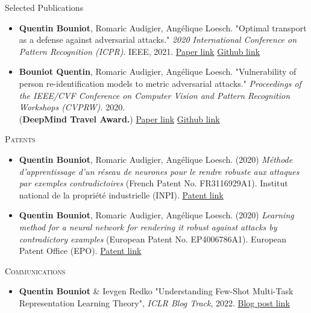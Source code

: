\documentclass{resume} %
\begin{document}
\begin{rSection}{Selected Publications}
\begin{itemize}[label=$\cdot$]
        \item \textbf{Quentin Bouniot}, Romaric Audigier, Angélique Loesch. "Optimal transport as a defense against adversarial attacks." \emph{2020 International Conference on Pattern Recognition (ICPR)}. IEEE, 2021. \href{https://arxiv.org/abs/2102.03156}{Paper link} \href{https://github.com/CEA-LIST/adv-sat}{Github link}

        \item \textbf{Bouniot Quentin}, Romaric Audigier, Angélique Loesch. "Vulnerability of person re-identification models to metric adversarial attacks." \emph{Proceedings of the IEEE/CVF Conference on Computer Vision and Pattern Recognition Workshops (CVPRW).} 2020. \\ (\textbf{DeepMind Travel Award.}) \href{https://openaccess.thecvf.com/content_CVPRW_2020/html/w47/Bouniot_Vulnerability_of_Person_Re-Identification_Models_to_Metric_Adversarial_Attacks_CVPRW_2020_paper.html}{Paper link} \href{https://github.com/CEA-LIST/adv-reid}{Github link}
    \end{itemize}

    \textsc{Patents}

    \begin{itemize}[label=$\cdot$]
        \item \textbf{Quentin Bouniot}, Romaric Audigier, Angélique Loesch. (2020) \emph{Méthode d'apprentissage d'un réseau de neurones pour le rendre robuste aux attaques par exemples contradictoires} (French Patent No. FR3116929A1). Institut national de la propriété industrielle (INPI).
        \href{https://data.inpi.fr/brevets/FR3116929}{Patent link}

        \item \textbf{Quentin Bouniot}, Romaric Audigier, Angélique Loesch. (2020) \emph{Learning method for a neural network for rendering it robust against attacks by contradictory examples} (European Patent No. EP4006786A1). European Patent Office (EPO). \href{https://worldwide.espacenet.com/publicationDetails/biblio?locale=en_EP&CC=EP&date=20220601&NR=4006786A1&ND=3&KC=A1&rnd=1699608498751&FT=D#}{Patent link}
    \end{itemize}

    \textsc{Communications}

    \begin{itemize}[label=$\cdot$]
    \item \textbf{Quentin Bouniot} \& Ievgen Redko "Understanding Few-Shot Multi-Task Representation Learning Theory", \emph{ICLR Blog Track}, 2022. \href{https://iclr-blog-track.github.io/2022/03/25/understanding_mtr_meta/}{Blog post link}
    \end{itemize}


\end{rSection}
\end{document}
